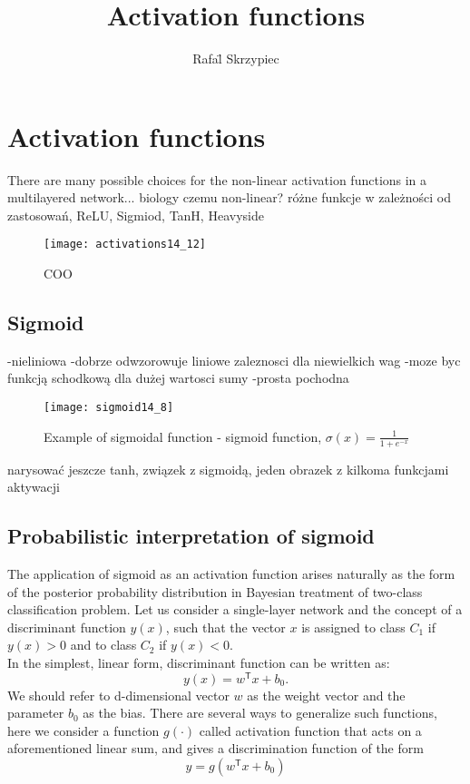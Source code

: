 \documentclass[]{article}
\title{Activation functions}
\author{Rafa\"l Skrzypiec}
\date{}
\theoremstyle{definition}
\begin{document}
\maketitle

\section{Activation functions}

There are many possible choices for the non-linear activation functions in a multilayered network... biology 
czemu non-linear?
różne funkcje w zależności od zastosowań, ReLU, Sigmiod, TanH, Heavyside 
\begin{figure}[h!]
	\centering
	\texttt{[image: activations14\_12]}
	\caption{COO}
\end{figure}



\subsection{Sigmoid}
-nieliniowa
-dobrze odwzorowuje liniowe zaleznosci dla niewielkich wag
-moze byc funkcją schodkową dla dużej wartosci sumy
-prosta pochodna

\begin{figure}[h!]
	\centering
	\texttt{[image: sigmoid14\_8]}
	\caption{Example of sigmoidal function - sigmoid function, $\sigma(x) = \frac{1}{1+e^{-x}}$}
\end{figure} 
narysować jeszcze tanh, związek z sigmoidą, jeden obrazek z kilkoma funkcjami aktywacji

\newpage

\subsection{Probabilistic interpretation of sigmoid}


The application of sigmoid as an activation function arises naturally as the form of the posterior probability distribution in Bayesian treatment of two-class classification problem.
%
Let us consider a single-layer network and the concept of a discriminant function $y(x)$, such that the vector $x$ is assigned to class $C_1$ if $y(x) > 0$ and to class $C_2$ if $y(x) < 0$.
\\

In the simplest, linear form, discriminant function can be written as:
%
\begin{equation}
y(x) = w^\mathsf{T} x + b_0.
\end{equation}
%
We should refer to d-dimensional vector $w$ as the weight vector and the parameter $b_0$ as the bias.
There are several ways to generalize such functions, here we consider a function $g(\cdot)$ called activation function that acts on a aforementioned linear sum, and gives a discrimination function of the form
%
\begin{equation}
y = g\left(w^\mathsf{T} x + b_0 \right)
\end{equation}
%
\def\layersep{2.5cm}
\end{document}
